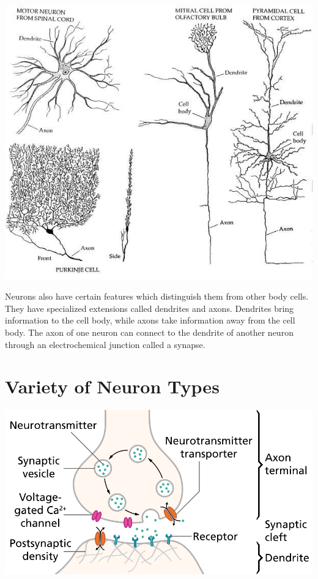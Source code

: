 \documentclass[11pt]{article}
\begin{document}
\includegraphics[width=\textwidth,height=\textheight,keepaspectratio]{img_6}

Neurons also have certain features which distinguish them from other body cells.
They have specialized extensions called dendrites and axons.
Dendrites bring information to the cell body, while axons take information away from the cell body.
The axon of one neuron can connect to the dendrite of another neuron through an electrochemical junction called a synapse.

\section{Variety of Neuron Types}\label{sec:variety-of-neuron-types}
\includegraphics[width=\textwidth,height=\textheight,keepaspectratio]{img_7}
\end{document}
